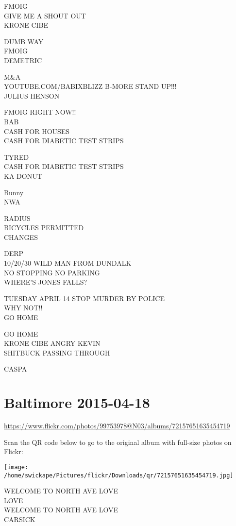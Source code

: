 \documentclass[10pt,letterpaper]{article}
\begin{document}
FMOIG\\
GIVE ME A SHOUT OUT\\
KRONE CIBE

DUMB WAY\\
FMOIG\\
DEMETRIC

M\&A\\
YOUTUBE.COM/BABIXBLIZZ B{-}MORE STAND UP!!!\\
JULIUS HENSON

FMOIG RIGHT NOW!!\\
BAB\\
CASH FOR HOUSES\\
CASH FOR DIABETIC TEST STRIPS

TYRED\\
CASH FOR DIABETIC TEST STRIPS\\
KA DONUT

Bunny\\
NWA

RADIUS\\
BICYCLES PERMITTED\\
CHANGES

DERP\\
10/20/30 WILD MAN FROM DUNDALK\\
NO STOPPING NO PARKING\\
WHERE'S JONES FALLS?

TUESDAY APRIL 14 STOP MURDER BY POLICE\\
WHY NOT!!\\
GO HOME

GO HOME\\
KRONE CIBE ANGRY KEVIN\\
SHITBUCK PASSING THROUGH

CASPA
\pagebreak

\section*{Baltimore 2015-04-18}

\url{https://www.flickr.com/photos/99753978@N03/albums/72157651635454719}

Scan the QR code below to go to the original album with full-size photos on Flickr:

\texttt{[image: /home/swickape/Pictures/flickr/Downloads/qr/72157651635454719.jpg]}
\pagebreak

WELCOME TO NORTH AVE LOVE\\
LOVE\\
WELCOME TO NORTH AVE LOVE\\
CARSICK
\end{document}
